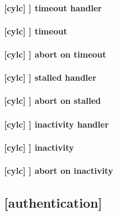 \paragraph[timeout handler]{[cylc] \textrightarrow [[events]] \textrightarrow timeout handler}

\paragraph[timeout]{[cylc] \textrightarrow [[events]] \textrightarrow timeout}

\paragraph[abort on timeout]{[cylc] \textrightarrow [[events]] \textrightarrow abort on timeout}

\paragraph[stalled handler]{[cylc] \textrightarrow [[events]] \textrightarrow stalled handler}

\paragraph[abort on stalled]{[cylc] \textrightarrow [[events]] \textrightarrow abort on stalled}

\paragraph[inactivity handler]{[cylc] \textrightarrow [[events]] \textrightarrow inactivity handler}

\paragraph[inactivity]{[cylc] \textrightarrow [[events]] \textrightarrow inactivity}

\paragraph[abort on inactivity]{[cylc] \textrightarrow [[events]] \textrightarrow abort on inactivity}

\subsection{[authentication]}
\label{GlobalAuth}

